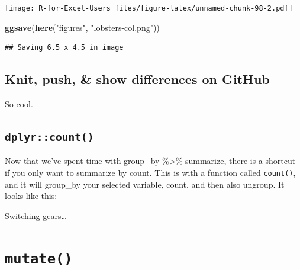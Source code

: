 \documentclass[]{book}
\newenvironment{Shaded}{\begin{snugshade}}{\end{snugshade}}
\newcommand{\CommentTok}[1]{\textcolor[rgb]{0.56,0.35,0.01}{\textit{#1}}}
\newcommand{\DataTypeTok}[1]{\textcolor[rgb]{0.13,0.29,0.53}{#1}}
\newcommand{\KeywordTok}[1]{\textcolor[rgb]{0.13,0.29,0.53}{\textbf{#1}}}
\newcommand{\NormalTok}[1]{#1}
\newcommand{\OperatorTok}[1]{\textcolor[rgb]{0.81,0.36,0.00}{\textbf{#1}}}
\newcommand{\StringTok}[1]{\textcolor[rgb]{0.31,0.60,0.02}{#1}}
\begin{document}
\texttt{[image: R-for-Excel-Users\_files/figure-latex/unnamed-chunk-98-2.pdf]}

\begin{Shaded}
\begin{Highlighting}[]
\KeywordTok{ggsave}\NormalTok{(}\KeywordTok{here}\NormalTok{(}\StringTok{"figures"}\NormalTok{, }\StringTok{"lobsters-col.png"}\NormalTok{))}
\end{Highlighting}
\end{Shaded}

\begin{verbatim}
## Saving 6.5 x 4.5 in image
\end{verbatim}

\hypertarget{knit-push-show-differences-on-github}{%
\subsection{Knit, push, \& show differences on GitHub}\label{knit-push-show-differences-on-github}}

So cool.

\hypertarget{dplyrcount}{%
\subsection{\texorpdfstring{\texttt{dplyr::count()}}{dplyr::count()}}\label{dplyrcount}}

Now that we've spent time with group\_by \%\textgreater{}\% summarize, there is a shortcut if you only want to summarize by count. This is with a function called \texttt{count()}, and it will group\_by your selected variable, count, and then also ungroup. It looks like this:

\begin{Shaded}
\end{Shaded}

Switching gears\ldots{}

\hypertarget{mutate}{%
\section{\texorpdfstring{\texttt{mutate()}}{mutate()}}\label{mutate}}
\end{document}
